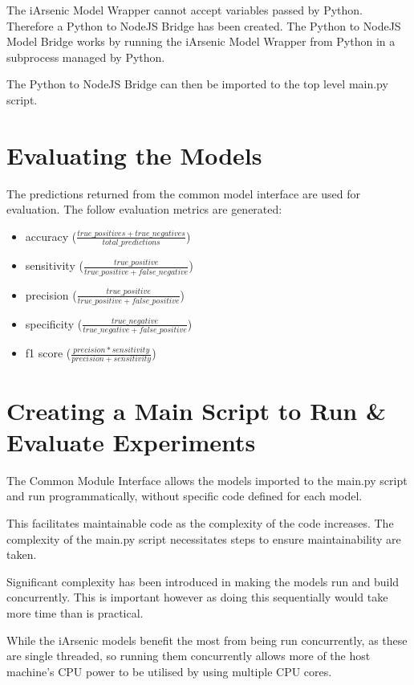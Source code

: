 The iArsenic Model Wrapper cannot accept variables passed by Python. Therefore a Python to NodeJS Bridge has been created. The Python to NodeJS Model Bridge works by running the iArsenic Model Wrapper from Python in a subprocess managed by Python.

The Python to NodeJS Bridge can then be imported to the top level main.py script.

\section{Evaluating the Models}

The predictions returned from the common model interface are used for evaluation. The follow evaluation metrics are generated:
\begin{itemize}
  \item accuracy (\(\frac{true\_positives + true\_negatives}{total\_predictions}\))
  \item sensitivity (\(\frac{true\_positive}{true\_positive + false\_negative}\))
  \item precision (\(\frac{true\_positive}{true\_positive + false\_positive}\))
  \item specificity (\(\frac{true\_negative}{true\_negative + false\_positive}\))
  \item f1 score (\(\frac{precision * sensitivity}{precision + sensitivity}\))
\end{itemize}

\section{Creating a Main Script to Run \& Evaluate Experiments}

The Common Module Interface allows the models imported to the main.py script and run programmatically, without specific code defined for each model. 

This facilitates maintainable code as the complexity of the code increases. The complexity of the main.py script necessitates steps to ensure maintainability are taken. 

Significant complexity has been introduced in making the models run and build concurrently. This is important however as doing this sequentially would take more time than is practical.

While the iArsenic models benefit the most from being run concurrently, as these are single threaded, so running them concurrently allows more of the host machine's CPU power to be utilised by using multiple CPU cores.

